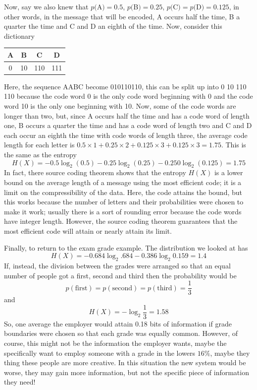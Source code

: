 \documentclass[12pt]{article}
\begin{document}
Now, say we also knew that $p($A$)=0.5$, $p($B$)=0.25$,
$p($C$)=p($D$)=0.125$, in other words, in the message that will be
encoded, A occurs half the time, B a quarter the time and C and D an
eighth of the time. Now, consider this dictionary
\begin{center}
\begin{tabular}{cccc}
A&B&C&D\\
\hline
0&10&110&111
\end{tabular}
\end{center}
Here, the sequence AABC become 010110110, this can be split up into 0
10 110 110 because the code word 0 is the only code word beginning
with 0 and the code word 10 is the only one beginning with 10. Now,
some of the code words are longer than two, but, since A occurs half
the time and has a code word of length one, B occurs a quarter the
time and has a code word of length two and C and D each occur an
eighth the time with code words of length three, the average code
length for each letter is $0.5\times 1 +0.25\times 2 + 0.125\times 3 +
0.125\times 3=1.75$. This is the same as the entropy
\begin{equation}
H(X)=-0.5\log_2(0.5)-0.25\log_2(0.25)-0.250\log_2(0.125)=1.75
\end{equation}
In fact, there source coding theorem shows that the entropy $H(X)$ is
a lower bound on the average length of a message using the most
efficient code; it is a limit on the compressibility of the
data. Here, the code attains the bound, but this works because the
number of letters and their probabilities were chosen to make it work;
usually there is a sort of rounding error because the code words have
integer length. However, the source coding theorem guarantees that the
most efficient code will attain or nearly attain its limit.

Finally, to return to the exam grade example. The distribution we looked at has
\begin{equation}
H(X)=-0.684\log_2{.684}-0.386\log_2{0.159}=1.4
\end{equation}
If, instead, the division between the grades were arranged so that an equal number of people got a first, second and third then the probability would be 
\begin{equation}
p(\mbox{first})=p(\mbox{second})=p(\mbox{third})=\frac{1}{3}
\end{equation}
and
\begin{equation}
H(X)=-\log_2\frac{1}{3}=1.58
\end{equation}
So, one average the employer would attain 0.18 bits of information if
grade boundaries were chosen so that each grade was equally
common. However, of course, this might not be the information the
employer wants, maybe the specifically want to employ someone with a
grade in the lowers $16\%$, maybe they thing these people are more
creative. In this situation the new system would be worse, they may
gain more information, but not the specific piece of information they
need!
\end{document}
